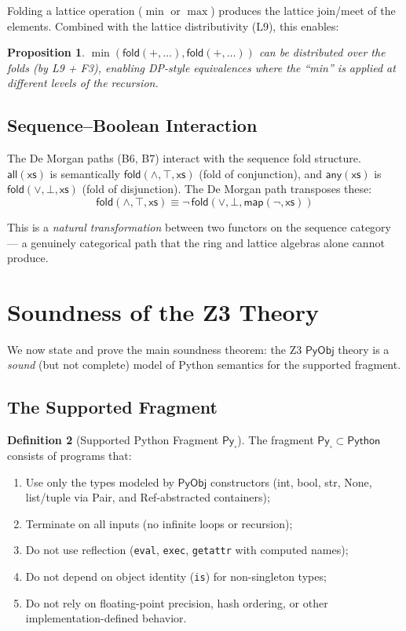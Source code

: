\documentclass[11pt,a4paper]{report}
\theoremstyle{definition}
\newtheorem{definition}{Definition}[chapter]
\theoremstyle{plain}
\newtheorem{proposition}[definition]{Proposition}
\newcommand{\PyObj}{\mathsf{PyObj}}
\newcommand{\fold}{\mathsf{fold}}
\begin{document}
Folding a lattice operation ($\min$ or $\max$) produces the
lattice join/meet of the elements.  Combined with the lattice
distributivity (L9), this enables:

\begin{proposition}
$\min(\fold(+, \ldots), \fold(+, \ldots))$ can be distributed
over the folds (by L9 + F3), enabling DP-style equivalences
where the ``min'' is applied at different levels of the recursion.
\end{proposition}

\subsection{Sequence--Boolean Interaction}

The De Morgan paths (B6, B7) interact with the sequence fold
structure.  $\mathsf{all}(\mathsf{xs})$ is semantically
$\fold(\land, \top, \mathsf{xs})$ (fold of conjunction), and
$\mathsf{any}(\mathsf{xs})$ is $\fold(\lor, \bot, \mathsf{xs})$
(fold of disjunction).  The De Morgan path transposes these:
\[
  \fold(\land, \top, \mathsf{xs}) \equiv
  \lnot\,\fold(\lor, \bot, \mathsf{map}(\lnot, \mathsf{xs}))
\]

This is a \emph{natural transformation} between two functors on
the sequence category --- a genuinely categorical path that the ring
and lattice algebras alone cannot produce.


\section{Soundness of the Z3 Theory}

We now state and prove the main soundness theorem: the Z3 $\PyObj$
theory is a \emph{sound} (but not complete) model of Python
semantics for the supported fragment.

\subsection{The Supported Fragment}

\begin{definition}[Supported Python Fragment $\mathsf{Py}_\square$]
\label{def:supported-fragment}
The fragment $\mathsf{Py}_\square \subset \mathsf{Python}$ consists
of programs that:
\begin{enumerate}
  \item Use only the types modeled by $\PyObj$ constructors
    (int, bool, str, None, list/tuple via Pair, and Ref-abstracted
    containers);
  \item Terminate on all inputs (no infinite loops or recursion);
  \item Do not use reflection (\texttt{eval}, \texttt{exec},
    \texttt{getattr} with computed names);
  \item Do not depend on object identity (\texttt{is}) for
    non-singleton types;
  \item Do not rely on floating-point precision, hash ordering,
    or other implementation-defined behavior.
\end{enumerate}
\end{definition}
\end{document}
